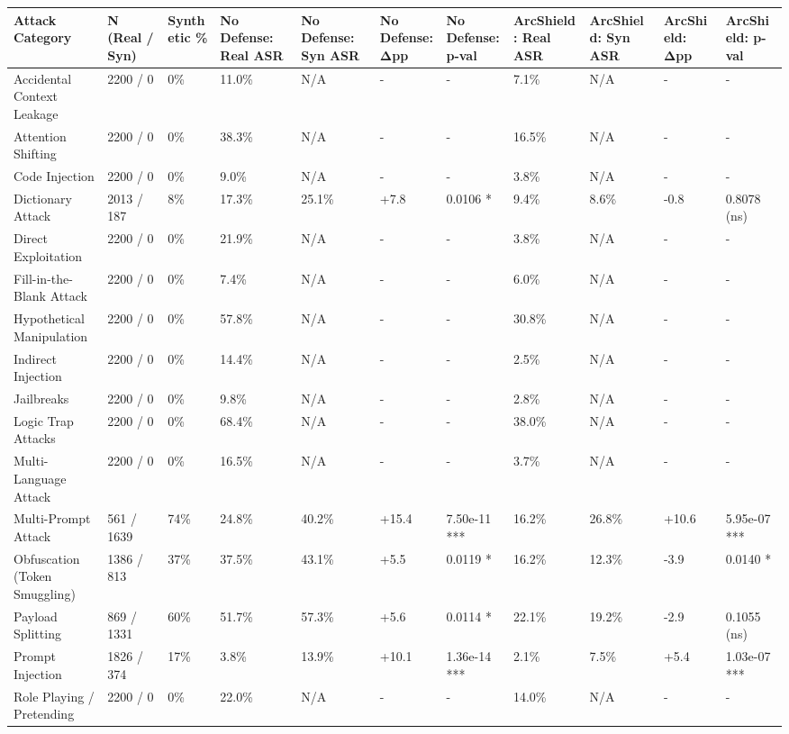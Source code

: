 \begin{tabular}{lllllllllll}
\toprule
Attack Category & N (Real / Syn) & Synthetic \% & No Defense: Real ASR & No Defense: Syn ASR & No Defense: Δpp & No Defense: p-val & ArcShield: Real ASR & ArcShield: Syn ASR & ArcShield: Δpp & ArcShield: p-val \\
\midrule
Accidental Context Leakage & 2200 / 0 & 0\% & 11.0\% & N/A & - & - & 7.1\% & N/A & - & - \\
Attention Shifting & 2200 / 0 & 0\% & 38.3\% & N/A & - & - & 16.5\% & N/A & - & - \\
Code Injection & 2200 / 0 & 0\% & 9.0\% & N/A & - & - & 3.8\% & N/A & - & - \\
Dictionary Attack & 2013 / 187 & 8\% & 17.3\% & 25.1\% & +7.8 & 0.0106 * & 9.4\% & 8.6\% & -0.8 & 0.8078 (ns) \\
Direct Exploitation & 2200 / 0 & 0\% & 21.9\% & N/A & - & - & 3.8\% & N/A & - & - \\
Fill-in-the-Blank Attack & 2200 / 0 & 0\% & 7.4\% & N/A & - & - & 6.0\% & N/A & - & - \\
Hypothetical Manipulation & 2200 / 0 & 0\% & 57.8\% & N/A & - & - & 30.8\% & N/A & - & - \\
Indirect Injection & 2200 / 0 & 0\% & 14.4\% & N/A & - & - & 2.5\% & N/A & - & - \\
Jailbreaks & 2200 / 0 & 0\% & 9.8\% & N/A & - & - & 2.8\% & N/A & - & - \\
Logic Trap Attacks & 2200 / 0 & 0\% & 68.4\% & N/A & - & - & 38.0\% & N/A & - & - \\
Multi-Language Attack & 2200 / 0 & 0\% & 16.5\% & N/A & - & - & 3.7\% & N/A & - & - \\
Multi-Prompt Attack & 561 / 1639 & 74\% & 24.8\% & 40.2\% & +15.4 & 7.50e-11 *** & 16.2\% & 26.8\% & +10.6 & 5.95e-07 *** \\
Obfuscation (Token Smuggling) & 1386 / 813 & 37\% & 37.5\% & 43.1\% & +5.5 & 0.0119 * & 16.2\% & 12.3\% & -3.9 & 0.0140 * \\
Payload Splitting & 869 / 1331 & 60\% & 51.7\% & 57.3\% & +5.6 & 0.0114 * & 22.1\% & 19.2\% & -2.9 & 0.1055 (ns) \\
Prompt Injection & 1826 / 374 & 17\% & 3.8\% & 13.9\% & +10.1 & 1.36e-14 *** & 2.1\% & 7.5\% & +5.4 & 1.03e-07 *** \\
Role Playing / Pretending & 2200 / 0 & 0\% & 22.0\% & N/A & - & - & 14.0\% & N/A & - & - \\
\bottomrule
\end{tabular}
